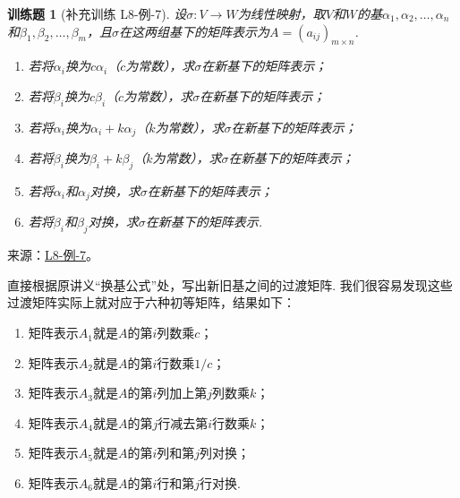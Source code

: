 \documentclass[12pt,fontset=fandol]{ctexart}
\newtheorem{exercise}{训练题}[section]
\begin{document}
\begin{exercise}[补充训练 L8-例-7]\label{prob:L8-例-7}
设$\sigma:V\to W$为线性映射，取$V$和$W$的基$\alpha_1,\alpha_2,\ldots,\alpha_n$和$\beta_1,\beta_2,\ldots,\beta_m$，且$\sigma$在这两组基下的矩阵表示为$A=(a_{ij})_{m\times n}$.
    \begin{enumerate}
        \item 若将$\alpha_i$换为$c\alpha_i$（$c$为常数），求$\sigma$在新基下的矩阵表示；

        \item 若将$\beta_i$换为$c\beta_i$（$c$为常数），求$\sigma$在新基下的矩阵表示；

        \item 若将$\alpha_i$换为$\alpha_i+k\alpha_j$（$k$为常数），求$\sigma$在新基下的矩阵表示；

        \item 若将$\beta_i$换为$\beta_i+k\beta_j$（$k$为常数），求$\sigma$在新基下的矩阵表示；

        \item 若将$\alpha_i$和$\alpha_j$对换，求$\sigma$在新基下的矩阵表示；

        \item 若将$\beta_i$和$\beta_j$对换，求$\sigma$在新基下的矩阵表示.
    \end{enumerate}
\end{exercise}
\noindent 来源：\href{https://github.com/yhwu-is/Linear-Algebra-Left-Undone/blob/new/%E8%AE%B2%E4%B9%89/%E4%B8%93%E9%A2%98/8%20%E7%9B%B8%E6%8A%B5%E6%A0%87%E5%87%86%E5%BD%A2.tex}{L8-例-7}。
\begin{solve}
直接根据原讲义“换基公式”处，写出新旧基之间的过渡矩阵. 我们很容易发现这些过渡矩阵实际上就对应于六种初等矩阵，结果如下：
    \begin{enumerate}
        \item 矩阵表示$A_1$就是$A$的第$i$列数乘$c$；

        \item 矩阵表示$A_2$就是$A$的第$i$行数乘$1/c$；

        \item 矩阵表示$A_3$就是$A$的第$i$列加上第$j$列数乘$k$；

        \item 矩阵表示$A_4$就是$A$的第$j$行减去第$i$行数乘$k$；

        \item 矩阵表示$A_5$就是$A$的第$i$列和第$j$列对换；

        \item 矩阵表示$A_6$就是$A$的第$i$行和第$j$行对换.
    \end{enumerate}
\end{solve}
\end{document}
